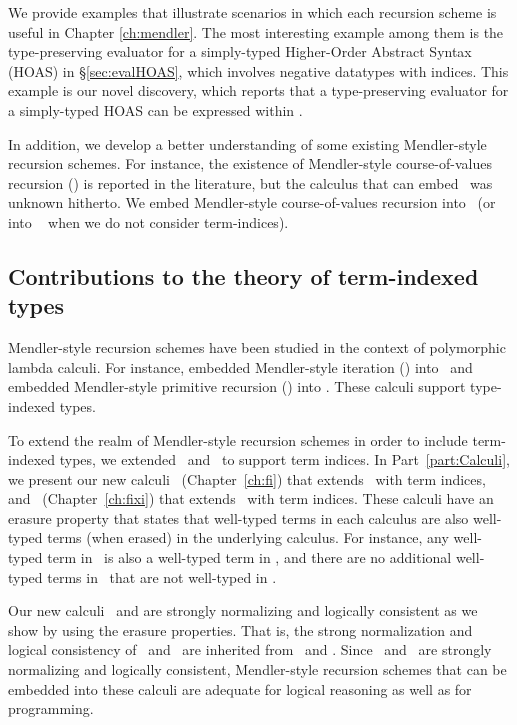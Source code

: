 We provide examples that illustrate scenarios in which each recursion scheme is
useful in Chapter \ref{ch:mendler}. The most interesting example among them is
the type-preserving evaluator for a simply-typed Higher-Order Abstract Syntax
(HOAS) in \S\ref{sec:evalHOAS}, which involves negative datatypes with indices.
This example is our novel discovery, which reports that
a type-preserving evaluator for a simply-typed HOAS can be expressed within \Fw.

In addition, we develop a better understanding of some existing
Mendler-style recursion schemes. For instance, the existence of
Mendler-style course-of-values recursion (\McvPr) is reported
in the literature, but the calculus that can embed \McvPr\ was unknown hitherto.
We embed Mendler-style course-of-values recursion into \Fixi\ 
(or into \Fixw\ \cite{AbeMat04} when we do not consider term-indices).

\subsection{Contributions to the theory of term-indexed types}
Mendler-style recursion schemes have been studied in the context of
polymorphic lambda calculi. For instance, \citet{AbeMatUus03} embedded 
Mendler-style iteration (\MIt) into \Fw\ and \citet{AbeMat04} embedded
Mendler-style primitive recursion (\MPr) into \Fixw. These calculi
support type-indexed types.

To extend the realm of Mendler-style recursion schemes in order to include
term-indexed types, we extended \Fw\ and \Fixw\ to support term indices.
In Part~\ref{part:Calculi}, we present our new calculi
\Fi\ (Chapter~\ref{ch:fi}) that extends \Fw\ with term indices, and
\Fixi\ (Chapter~\ref{ch:fixi}) that extends \Fixw\ with term indices.
These calculi have an erasure property that states that well-typed terms
in each calculus are also well-typed terms (when erased) in the 
underlying calculus. For instance, any well-typed term in \Fi\ is also
a well-typed term in \Fw, and there are no additional well-typed terms
in \Fi\ that are not well-typed in \Fw.

Our new calculi \Fi\ and \Fixi are strongly normalizing and
logically consistent as we show by using the erasure properties.
That is, the strong normalization and logical consistency of
\Fi\ and \Fixi\ are inherited from \Fw\ and \Fixw.
Since \Fi\ and \Fixi\ are strongly normalizing and
logically consistent, Mendler-style recursion schemes
that can be embedded into these calculi are adequate
for logical reasoning as well as for programming.

